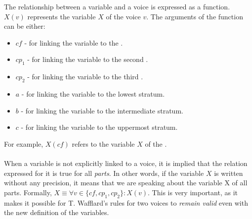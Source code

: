 The relationship between a variable and a voice is expressed as a function. $X(v)$ represents the variable $X$ of the voice $v$. The arguments of the function can be either:
\begin{itemize}
    \item $\mathit{cf}$ - for linking the variable to the \cf.
    \item $cp_1$ - for linking the variable to the second \cp.
    \item $cp_2$ - for linking the variable to the third \cp.
    \item $a$ - for linking the variable to the lowest stratum.
    \item $b$ - for linking the variable to the intermediate stratum.
    \item $c$ - for linking the variable to the uppermost stratum.
  \end{itemize}

\noindent For example, $X(\mathit{cf})$ refers to the variable $X$ of the \cf.

\paragraph{}
When a variable is not explicitly linked to a voice, it is implied that the relation expressed for it is true for all \textit{parts}. In other words, if the variable $X$ is written without any precision, it means that we are speaking about the variable X of all parts. Formally, $X \equiv \forall v \in \{\mathit{cf}, cp_1, cp_2\}: X(v)$. This is very important, as it makes it possible for T. Wafflard's rules for two voices to \textit{remain valid} even with the new definition of the variables.

